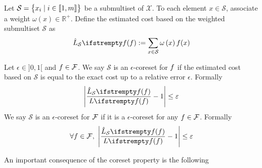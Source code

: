 Let $\mathcal{S}=\begin{Bmatrix}
x_{i} \mid i\in \llbracket 1,m \rrbracket
\end{Bmatrix}$ be a submultiset of $\mathcal{X}$. To each element $x \in \mathcal{S}$, associate a weight $\omega\left(x\right) \in \mathbb{R}^{+}$. Define the estimated cost based on the weighted submultiset $\mathcal{S}$ as
$$
\estloss{\mathcal{S}}{\query}:=\sum_{x \in \mathcal{S}} \omega\left(x\right) \query(x)
$$
\begin{definition}[Coreset]
    \label{def_coresetprop}
    Let $\epsilon \in {]}0,1{[}$ and $f \in \mathcal{F}$. We say $\mathcal{S}$ is an $\epsilon$-coreset for $f$ if the estimated cost based on $\mathcal{S}$ is equal to the exact cost up to a relative error $\epsilon$. Formally
    \begin{equation}
        \label{eqn_querycoresetprop}
        \left|\frac{\estloss{\mathcal{S}}{\query}}{\loss{\query}}-1\right| \le \epsilon 
    \end{equation}
    We say $\mathcal{S}$ is an $\epsilon$-coreset for $\mathcal{F}$ if it is a $\epsilon$-coreset for any $f \in \mathcal{F}$. Formally
    \begin{equation}
        \label{eqn_qsetcoresetprop}
        \forall \query \in \qset,\ \left|\frac{\estloss{\mathcal{S}}{\query}}{\loss{\query}}-1\right| \le \epsilon 
    \end{equation}
\end{definition}
An important consequence of the coreset property is the following

